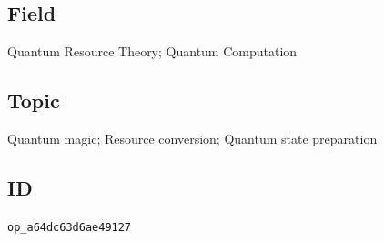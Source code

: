 \subsection*{Field}

Quantum Resource Theory; Quantum Computation

\subsection*{Topic}

Quantum magic; Resource conversion; Quantum state preparation

\subsection*{ID}

\texttt{op\_a64dc63d6ae49127}
